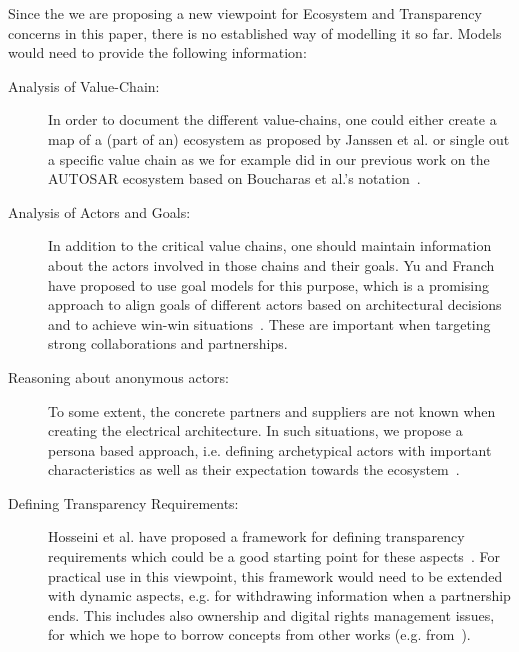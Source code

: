 Since the we are proposing a new viewpoint for Ecosystem and Transparency concerns in this paper, there is no established way of modelling it so far. 
Models would need to provide the following information:
\begin{description}
\item[Analysis of Value-Chain:] In order to document the different value-chains, one could either create a map of a (part of an) ecosystem as proposed by Janssen et al. \cite{Jansen2012b} or single out a specific value chain as we for example did in our previous work on the AUTOSAR ecosystem \cite{Soltani2015a} based on Boucharas et al.'s notation~\cite{BJB2009}.
\item[Analysis of Actors and Goals:] In addition to the critical value chains, one should maintain information about the actors involved in those chains and their goals.
Yu and Franch have proposed to use goal models for this purpose, which is a promising approach to align goals of different actors based on architectural decisions and to achieve win-win situations~\cite{FSY2015}. %
These are important when targeting strong collaborations and partnerships.
\item[Reasoning about anonymous actors:] To some extent, the concrete partners and suppliers are not known when creating the electrical architecture. 
In such situations, we propose a persona based approach, i.e. defining archetypical actors with important characteristics as well as their expectation towards the ecosystem~\cite{Knauss2014c,Hammouda2015}.
\item[Defining Transparency Requirements:] Hosseini et al. have proposed a framework for defining transparency requirements which could be a good starting point for these aspects~\cite{Hosseini2016,HSP+2016}. 
For practical use in this viewpoint, this framework would need to be extended with dynamic aspects, e.g. for withdrawing information when a partnership ends. 
This includes also ownership and digital rights management issues, for which we hope to borrow concepts from other works (e.g. from~\cite{Averbakh2014}).
\end{description}


